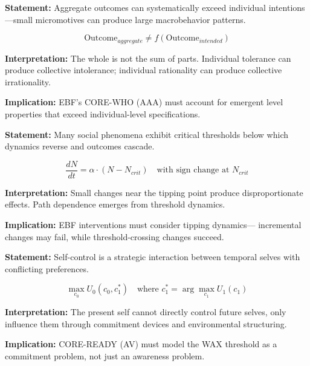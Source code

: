 \begin{tcolorbox}[colback=gray!5!white, colframe=gray!75!black,
    title=Axiom TS-2: Emergent Macrobehavior]
\textbf{Statement:} Aggregate outcomes can systematically exceed individual
intentions---small micromotives can produce large macrobehavior patterns.

\begin{equation}
\text{Outcome}_{aggregate} \neq f(\text{Outcome}_{intended})
\end{equation}

\textbf{Interpretation:} The whole is not the sum of parts. Individual tolerance
can produce collective intolerance; individual rationality can produce collective
irrationality.

\textbf{Implication:} EBF's CORE-WHO (AAA) must account for emergent level
properties that exceed individual-level specifications.
\end{tcolorbox}

\begin{tcolorbox}[colback=gray!5!white, colframe=gray!75!black,
    title=Axiom TS-3: Tipping Point Dynamics]
\textbf{Statement:} Many social phenomena exhibit critical thresholds below
which dynamics reverse and outcomes cascade.

\begin{equation}
\frac{dN}{dt} = \alpha \cdot (N - N_{crit}) \quad \text{with sign change at } N_{crit}
\end{equation}

\textbf{Interpretation:} Small changes near the tipping point produce
disproportionate effects. Path dependence emerges from threshold dynamics.

\textbf{Implication:} EBF interventions must consider tipping dynamics---
incremental changes may fail, while threshold-crossing changes succeed.
\end{tcolorbox}

\begin{tcolorbox}[colback=gray!5!white, colframe=gray!75!black,
    title=Axiom TS-4: Self-Command as Strategic Problem]
\textbf{Statement:} Self-control is a strategic interaction between temporal
selves with conflicting preferences.

\begin{equation}
\max_{c_0} U_0(c_0, c_1^*) \quad \text{where } c_1^* = \arg\max_{c_1} U_1(c_1)
\end{equation}

\textbf{Interpretation:} The present self cannot directly control future selves,
only influence them through commitment devices and environmental structuring.

\textbf{Implication:} CORE-READY (AV) must model the WAX threshold as a
commitment problem, not just an awareness problem.
\end{tcolorbox}

